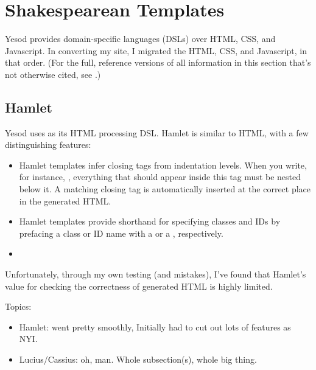 \section{Shakespearean Templates}

Yesod provides domain-specific languages (DSLs) over HTML, CSS, and Javascript. In converting my site, I migrated the HTML, CSS, and Javascript, in that order. (For the full, reference versions of all information in this section that's not otherwise cited, see \cite{ybkShakes}.)


\subsection{Hamlet}

Yesod uses  as its HTML processing DSL. Hamlet is similar to HTML, with a few distinguishing features:

\begin{itemize}
  \item {} Hamlet templates infer closing tags from indentation levels. When you write, for instance, , everything that should appear inside this tag must be nested below it. A matching closing tag is automatically inserted at the correct place in the generated HTML.
  \item {} Hamlet templates provide shorthand for specifying classes and IDs by prefacing a class or ID name with a  or a \code{\#}, respectively.
  \item {}
\end{itemize}

 Unfortunately, through my own testing (and mistakes), I've found that Hamlet's value for checking the correctness of generated HTML is highly limited.

Topics:
\begin{itemize}
  \item Hamlet: went pretty smoothly, Initially had to cut out lots of features as NYI.
  \item Lucius/Cassius: oh, man. Whole subsection(s), whole big thing.
\end{itemize}

